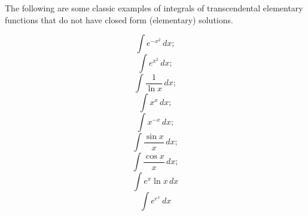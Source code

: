 \renewcommand{\thefootnote}{\fnsymbol{footnote}}	
The following are some classic examples of integrals of \gls{transcendental}
\gls{elementary} functions that do not have closed form (\gls{elementary})
solutions.

\begin{equation}
\label{erf}
\int{e^{-x^2}\,dx};
\end{equation}
\begin{equation}
\label{exp_x_squared}
\int{e^{x^2}\,dx};
\end{equation}
\begin{equation}
\label{li}
\int{\frac{1}{\ln{x}}\,dx};
\end{equation}
\begin{equation}
\label{x_to_the_x}
\int{x^x\,dx};
\end{equation}
\begin{equation}
\label{x_to_the_neg_x}
\int{x^{-x}\,dx};
\end{equation}
\begin{equation}
\label{Si}
\int{\frac{\sin{x}}{x}\,dx};
\end{equation}
\begin{equation}
\label{Ci}
\int{\frac{\cos{x}}{x}\,dx};
\end{equation}
\begin{equation}
\label{exp_x_ln_x}
\int{e^x\ln{x}\,dx}
\end{equation}
\begin{equation}
\label{exp_exp_x}
\int{e^{e^x}\,dx}
\end{equation}

